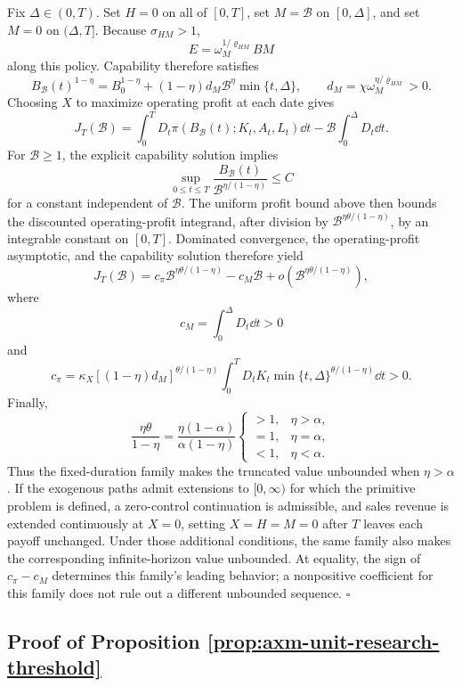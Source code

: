 Fix \(\Delta\in(0,T)\). Set \(H=0\) on all of \([0,T]\), set
\(M=\mathcal B\) on \([0,\Delta]\), and set \(M=0\) on
\((\Delta,T]\). Because \(\sigma_{HM}>1\),
\[
 E=\omega_M^{1/\varrho_{HM}}BM
\]
along this policy. Capability therefore satisfies
\[
 B_{\mathcal B}(t)^{1-\eta}
 =B_0^{1-\eta}+(1-\eta)d_M\mathcal B^\eta
   \min\{t,\Delta\},
 \qquad
 d_M=\chi\omega_M^{\eta/\varrho_{HM}}>0.
\]
Choosing \(X\) to maximize operating profit at each date gives
\[
 J_T(\mathcal B)
 =\int_0^T D_t\pi(B_{\mathcal B}(t);K_t,A_t,L_t)\dd t
 -\mathcal B\int_0^\Delta D_t\dd t.
\]
For \(\mathcal B\geq1\), the explicit capability solution implies
\[
 \sup_{0\leq t\leq T}
 \frac{B_{\mathcal B}(t)}
 {\mathcal B^{\eta/(1-\eta)}}\leq C
\]
for a constant independent of \(\mathcal B\). The uniform profit bound above
then bounds the discounted operating-profit integrand, after division by
\(\mathcal B^{\eta\theta/(1-\eta)}\), by an integrable constant on
\([0,T]\). Dominated convergence, the operating-profit asymptotic, and the
capability solution therefore yield
\begin{equation}
 J_T(\mathcal B)
 =c_\pi\mathcal B^{\eta\theta/(1-\eta)}
  -c_M\mathcal B
  +o\!\left(\mathcal B^{\eta\theta/(1-\eta)}\right),
 \label{eq:axm-research-burst-payoff}
\end{equation}
where
\[
 c_M=\int_0^\Delta D_t\dd t>0
\]
and
\[
 c_\pi=\kappa_X[(1-\eta)d_M]^{\theta/(1-\eta)}
 \int_0^T D_tK_t
 \min\{t,\Delta\}^{\theta/(1-\eta)}\dd t>0.
\]
Finally,
\[
 \frac{\eta\theta}{1-\eta}
 =\frac{\eta(1-\alpha)}{\alpha(1-\eta)}
 \begin{cases}
  >1,&\eta>\alpha,\\
  =1,&\eta=\alpha,\\
  <1,&\eta<\alpha.
 \end{cases}
\]
Thus the fixed-duration family makes the truncated value unbounded when
\(\eta>\alpha\). If the exogenous paths admit extensions to \([0,\infty)\)
for which the primitive problem is defined, a zero-control continuation is admissible,
and sales revenue is extended continuously at \(X=0\), setting \(X=H=M=0\)
after \(T\) leaves each payoff unchanged. Under those additional conditions,
the same family also makes the corresponding infinite-horizon value unbounded.
At equality, the sign of \(c_\pi-c_M\) determines this family's leading
behavior; a nonpositive coefficient for this family does not rule out a
different unbounded sequence.
\(\square\)

\subsection{Proof of Proposition \ref{prop:axm-unit-research-threshold}}

